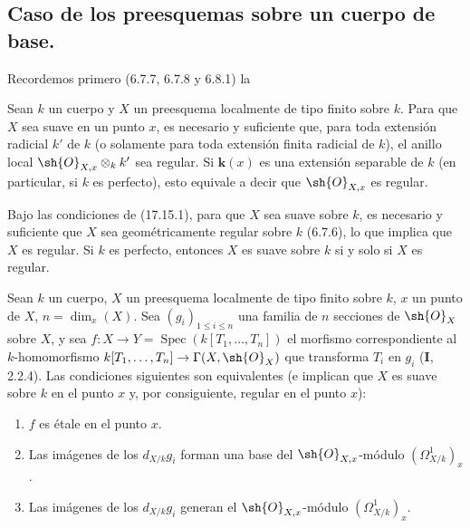 \subsection{Caso de los preesquemas sobre un cuerpo de base.}
\label{subsection:IV.17.15}

Recordemos primero (6.7.7, 6.7.8 y 6.8.1) la

\begin{proposition}[17.15.1]
\label{IV.17.15.1}
Sean $k$ un cuerpo y $X$ un preesquema localmente de tipo finito sobre $k$. Para que $X$ sea suave en un punto $x$, es necesario y suficiente que, para toda extensión radicial $k'$ de $k$ \textup{(o solamente para toda extensión} finita radicial \textup{de} $k$\textup{)}, el anillo local $\sh{O}_{X,x}\otimes_k k'$ sea regular. Si $\boldsymbol{k}(x)$ es una extensión separable de $k$ \textup{(en particular, si} $k$ \textup{es} perfecto\textup{)}, esto equivale a decir que $\sh{O}_{X,x}$ es regular.
\end{proposition}

\begin{corollary}[17.15.2]
\label{IV.17.15.2}
Bajo las condiciones de \textup{(17.15.1)}, para que $X$ sea suave sobre $k$, es necesario y suficiente que $X$ sea geométricamente regular sobre $k$ \textup{(6.7.6)}, lo que implica que $X$ es regular. Si $k$ es perfecto, entonces $X$ es suave sobre $k$ si y solo si $X$ es regular.
\end{corollary}

\begin{proposition}[17.15.3]
\label{IV.17.15.3}
Sean $k$ un cuerpo, $X$ un preesquema localmente de tipo finito sobre $k$, $x$ un punto de $X$, $n=\dim_x(X)$. Sea $(g_i)_{1\leq i\leq n}$ una familia de $n$ secciones de $\sh{O}_X$ sobre $X$, y sea $f:X\to Y=\operatorname{Spec}(k[T_1,\ldots,T_n])$ el morfismo correspondiente al $k$-homomorfismo $k[T_1,\ldots,T_n]\to\Gamma(X,\sh{O}_X)$ que transforma $T_i$ en $g_i$ \textup{(\textbf I, 2.2.4)}. Las condiciones siguientes son equivalentes (e implican que $X$ es suave sobre $k$ en el punto $x$ \textup{y, por consiguiente,} regular \textup{en el punto} $x$):
\begin{enumerate}
  \item[\textup{a)}] $f$ es étale en el punto $x$.
  \item[\textup{b)}] Las imágenes de los $d_{X/k}g_i$ forman una base del $\sh{O}_{X,x}$-módulo $(\varOmega^1_{X/k})_x$.
  \item[\textup{c)}] Las imágenes de los $d_{X/k}g_i$ generan el $\sh{O}_{X,x}$-módulo $(\varOmega^1_{X/k})_x$.
\end{enumerate}
\end{proposition}

